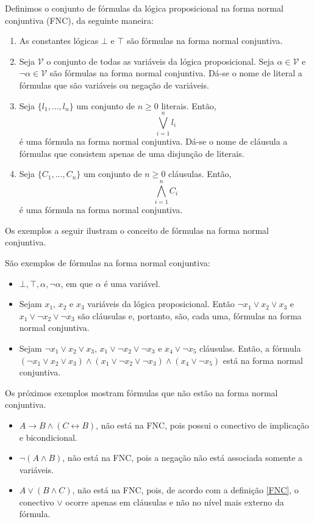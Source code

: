 \begin{Definition}\label{FNC}
Definimos o conjunto de fórmulas da lógica proposicional na forma
normal conjuntiva (FNC), da seguinte maneira:
\begin{enumerate}
  \item As constantes lógicas $\bot$ e $\top$ são fórmulas na forma
    normal conjuntiva.
  \item Seja $\mathcal{V}$ o conjunto de todas as variáveis da lógica
    proposicional. Seja $\alpha \in \mathcal{V}$ e
    $\neg\alpha\in\mathcal{V}$ são fórmulas na forma normal
    conjuntiva. Dá-se o nome de literal a fórmulas que são variáveis
    ou negação de variáveis.
  \item Seja $\{l_1,...,l_n\}$ um conjunto de $n\geq 0$
    literais. Então, \[\bigvee_{i=1}^nl_i\] é uma fórmula na forma
    normal conjuntiva. Dá-se o nome de cláusula a fórmulas que
    consistem apenas de uma disjunção de literais.
  \item Seja $\{C_1,...,C_n\}$ um conjunto de $n\geq 0$
    cláusulas. Então, \[\bigwedge_{i=1}^nC_i\] é uma fórmula na forma
    normal conjuntiva.
\end{enumerate}
\end{Definition}
Os exemplos a seguir ilustram o conceito de fórmulas na forma normal conjuntiva.
\begin{Example}
São exemplos de fórmulas na forma normal conjuntiva:
\begin{itemize}
     \item $\bot,\top,\alpha,\neg\alpha$, em que $\alpha$ é uma
       variável.
     \item Sejam $x_1$, $x_2$ e $x_3$ variáveis da lógica
       proposicional. Então $\neg x_1 \lor x_2 \lor x_3$ e $x_1\lor
       \neg x_2 \lor \neg x_3$ são cláusulas e, portanto, são, cada
       uma, fórmulas na forma normal conjuntiva.
     \item Sejam $\neg x_1 \lor x_2 \lor x_3$, $x_1\lor
       \neg x_2 \lor \neg x_3$ e $x_4 \lor \neg x_5$ cláusulas. Então, a fórmula
       $(\neg x_1 \lor x_2 \lor x_3)\land (x_1\lor
       \neg x_2 \lor \neg x_3) \land (x_4 \lor \neg x_5)$ está na forma normal conjuntiva.
\end{itemize}
Os próximos exemplos mostram fórmulas que não estão na forma normal
conjuntiva.
\begin{itemize}
    \item $A \to B \land (C \leftrightarrow B)$, não está na FNC, pois possui o conectivo de
      implicação e bicondicional.
    \item $\neg (A \land B)$, não está na FNC, pois a negação não está
      associada somente a variáveis.
    \item $A\lor(B \land C)$, não está na FNC, pois, de acordo com a
      definição \ref{FNC}, o conectivo $\lor$ ocorre apenas em
      cláusulas e não no nível mais externo da fórmula.
\end{itemize}
\end{Example}
